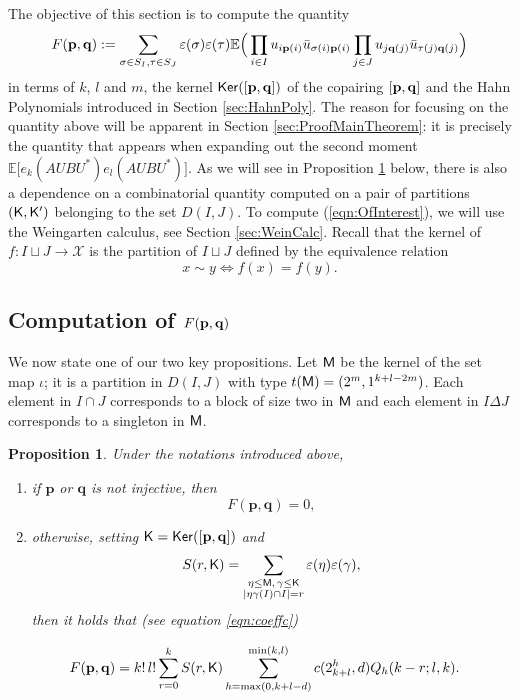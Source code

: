 \documentclass[11pt, a4paper, oneside, reqno]{amsart}
\newcommand{\copairpq}{{[{\bf p},{\bf q}]}}
\newcommand{\setK}{{D(I,J)}}
\newtheorem{proposition}[theorem]{Proposition}
\theoremstyle{remark}
\theoremstyle{definition}
\numberwithin{equation}{section}
\begin{document}
The objective of this section is to compute the quantity
\begin{equation}
	\label{eqn:OfInterest}
	F({\bf p}, {\bf q}):=\sum_{\sigma \in S_I, \tau \in S_J} \varepsilon (\sigma)\varepsilon(\tau)\mathbb{E}\Big(\prod_{i \in I} u_{i\mathbf{p}(i)}\bar{u}_{\sigma(i)\mathbf{p}(i)}\prod_{j \in J}u_{j\mathbf{q}(j)}\bar{u}_{\tau(j)\mathbf{q}(j)}\Big)
\end{equation}
in terms of $k$, $l$ and $m$, the kernel ${\sf Ker}(\copairpq)$ of the copairing $ \copairpq$ and the Hahn Polynomials introduced in Section \ref{sec:HahnPoly}. The reason for focusing on the quantity above will be apparent in Section \ref{sec:ProofMainTheorem}: it is precisely the quantity that appears when expanding out the second moment $\mathbb{E}\bigl[e_k(AUBU^*)e_l(AUBU^*)\bigr]$. As we will see in Proposition \ref{prop:FIJPQ} below, there is also a dependence on a combinatorial quantity computed on a pair of partitions $({\sf K, {\sf K'}})$ belonging to the set $\setK$. To compute (\ref{eqn:OfInterest}), we will use the Weingarten calculus, see Section \ref{sec:WeinCalc}.
Recall that the kernel of $f\colon I \sqcup J \to \mathcal{X}$ is the partition of $I \sqcup J$ defined by the equivalence relation
\begin{equation*}
	x \sim y \Leftrightarrow f(x) = f(y).
\end{equation*}


\subsection{Computation of $F({\bf p}, {\bf q})$}
\label{sec:ComputationFpq}
We now state one of our two key propositions. Let ${\sf M}$ be the kernel of the set map $\iota$; it is a partition in $\setK$ with type $t({\sf M })=(2^m, 1^{k+l-2m})$. Each element in $I \cap J$ corresponds to a block of size two in ${\sf M}$ and each element in $I \Delta J$ corresponds to a singleton in ${\sf M}$.
\newcommand{\Sr}{S(r, {\sf K})}
\begin{proposition}
\label{prop:FIJPQ}
Under the notations introduced above,
\begin{enumerate}
\item if $\mathbf p$ or $\mathbf q$ is not injective, then
\[
F(\mathbf p,\mathbf q)=0,
\]
\item otherwise,
setting ${\sf K}={\sf Ker}([\mathbf p,\mathbf q])$ and
\[
	S(r, {\sf K}) =
	\sum_{\substack{\eta \leq {\sf M},\, \gamma \leq {\sf K}\\
	|\eta\gamma(I)\cap I|=r}}
	\varepsilon(\eta)\varepsilon(\gamma),
\]
then it holds that (see equation \eqref{eqn:coeffc})

\begin{align}
F(\mathbf p,\mathbf q)
&= k!\,l!\sum_{r=0}^k S(r,{\sf K})
\sum_{h=\max(0,k+l-d)}^{\min(k,l)}
c(2^h_{k+l},d)Q_h(k-r;l,k).
\end{align}

\end{enumerate}
\end{proposition}
\end{document}
